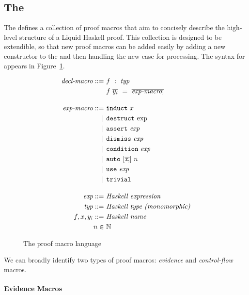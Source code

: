 \subsection{The \LangA}
\label{sec:proof-macro-lang}


The \LangA defines a collection of proof macros that aim to concisely
describe the high-level structure of a Liquid Haskell proof. This
collection is designed to be extendible, so that new proof macros can
be added easily by adding a new constructor to the \LangA and then
handling the new case for processing.  The syntax for \LangA appears
in Figure~\ref{fig:proof-macro-lang}.

\begin{figure}
\begin{align*}
  \textit{decl-macro} ::= &
    ~ f ~ : ~ \textit{typ} \\ &
    ~ f ~ \overline{y_i} ~ = ~ \overline{\textit{exp-macro} ;}
  \\[1em]
  \textit{exp-macro} ::= &
    ~ \mathtt{induct} ~ x \\ \mid &
    ~ \mathtt{destruct} ~ \text{exp} \\ \mid &
    ~ \mathtt{assert} ~ \textit{exp} \\ \mid &
    ~ \mathtt{dismiss} ~ \textit{exp} \\ \mid &
    ~ \mathtt{condition} ~ \textit{exp} \\ \mid &
    ~ \mathtt{auto} ~ [\overline{\textit{x} ,}] ~ n \\ \mid &
    ~ \mathtt{use} ~ \textit{exp} \\ \mid &
    ~ \mathtt{trivial}
  \\[1em]
  \textit{exp} ::= & ~ \textit{Haskell expression} 
  \\
  \textit{typ} ::= & ~ \textit{Haskell type (monomorphic)} 
  \\
  f, x, y_i ::= & ~ \textit{Haskell name} 
  \\
  n \in & ~ \mathbb{N}
\end{align*}
\caption{The proof macro language}
\label{fig:proof-macro-lang}
\end{figure}


We can broadly identify two types of proof macros: {\em evidence} and
{\em control-flow} macros.

\paragraph{Evidence Macros}

